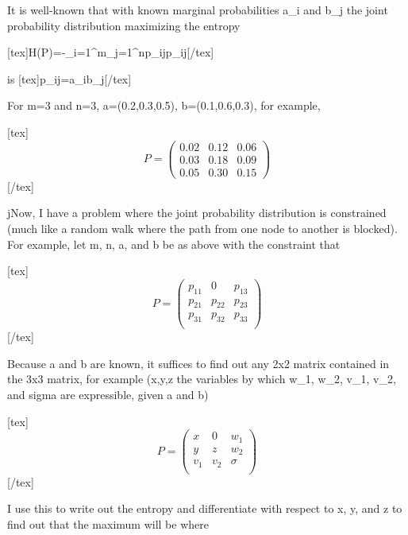 It is well-known that with known marginal probabilities a_{i} and
b_{j} the joint probability distribution maximizing the entropy

[tex]H(P)=-\sum_{i=1}^{m}\sum_{j=1}^{n}p_{ij}\log{}p_{ij}[/tex]

is [tex]p_{ij}=a_{i}b_{j}[/tex] 

For m=3 and n=3, a=(0.2,0.3,0.5), b=(0.1,0.6,0.3), for example,

[tex]\begin{equation}
  \label{eq:r1}
P=\left(
  \begin{array}{rrr}
    0.02 & 0.12 & 0.06 \\
    0.03 & 0.18 & 0.09 \\
    0.05 & 0.30 & 0.15
  \end{array}
\right)
\end{equation}[/tex]

jNow, I have a problem where the joint probability distribution is
constrained (much like a random walk where the path from one node to
another is blocked). For example, let m, n, a, and b be as above with
the constraint that

[tex]\begin{equation}
  \label{eq:r2}
P=\left(
  \begin{array}{rrr}
    p_{11} & 0 & p_{13} \\
    p_{21} & p_{22} & p_{23} \\
    p_{31} & p_{32} & p_{33} \\
  \end{array}
\right)
\end{equation}[/tex]

Because a and b are known, it suffices to find out any 2x2 matrix
contained in the 3x3 matrix, for example (x,y,z the variables by which
w_{1}, w_{2}, v_{1}, v_{2}, and sigma are expressible, given a and b)

[tex]\begin{equation}
  \label{eq:r3}
P=\left(
  \begin{array}{rrr}
    x & 0 & w_{1} \\
    y & z & w_{2} \\
    v_{1} & v_{2} & \sigma \\
  \end{array}
\right)
\end{equation}[/tex]

I use this to write out the entropy and differentiate with respect to
x, y, and z to find out that the maximum will be where

